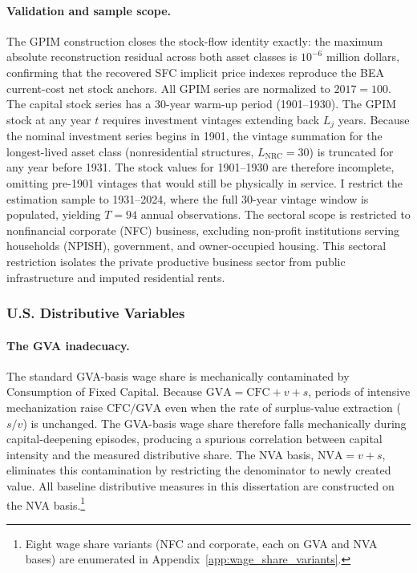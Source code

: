 \paragraph{Validation and sample scope.}
The GPIM construction closes the stock-flow identity exactly: the
maximum absolute reconstruction residual across both asset classes
is $10^{-6}$ million dollars, confirming that the recovered SFC
implicit price indexes reproduce the BEA current-cost net stock
anchors. All GPIM series are normalized to $2017 = 100$.
The capital stock series has a 30-year warm-up period (1901--1930).
The GPIM stock at any year $t$ requires investment vintages
extending back $L_j$ years. Because the nominal investment series
begins in 1901, the vintage summation for the longest-lived asset
class (nonresidential structures, $L_{\text{NRC}} = 30$) is
truncated for any year before 1931. The stock values for
1901--1930 are therefore incomplete, omitting pre-1901 vintages
that would still be physically in service. I restrict the
estimation sample to 1931--2024, where the full 30-year vintage
window is populated, yielding $T = 94$ annual observations.
The sectoral scope is restricted to nonfinancial corporate (NFC)
business, excluding non-profit institutions serving households
(NPISH), government, and owner-occupied housing. This sectoral
restriction isolates the private productive business sector from
public infrastructure and imputed residential rents.

\subsubsection{U.S. Distributive Variables}
\label{sec:413:us_distrib}

\paragraph{The GVA inadecuacy.}
The standard GVA-basis wage share is mechanically contaminated by
Consumption of Fixed Capital. Because $\text{GVA} = \text{CFC} + v
+ s$, periods of intensive mechanization raise
$\text{CFC}/\text{GVA}$ even when the rate of surplus-value
extraction ($s/v$) is unchanged. The GVA-basis wage share therefore
falls mechanically during capital-deepening episodes, producing a
spurious correlation between capital intensity and the measured
distributive share. The NVA basis, $\text{NVA} = v + s$, eliminates
this contamination by restricting the denominator to newly created
value. All baseline distributive measures in this dissertation are
constructed on the NVA basis.\footnote{Eight wage share variants
	(NFC and corporate, each on GVA and NVA bases) are enumerated in
	Appendix~\ref{app:wage_share_variants}.}


